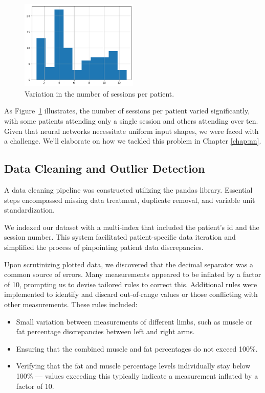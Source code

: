 \begin{figure}[h]
	\centering
	\includegraphics[width=0.5\textwidth]{files/sessions_per_patient}
	\caption{Variation in the number of sessions per patient.}
	\label{fig:sessions-per-patient}
\end{figure}

As Figure~\ref{fig:sessions-per-patient} illustrates, the number of sessions
per patient varied significantly, with some patients attending only a single
session and others attending over ten. Given that neural networks necessitate
uniform input shapes, we were faced with a challenge. We'll elaborate on how we
tackled this problem in Chapter \ref{chap:nn}.
\subsection{Data Cleaning and Outlier Detection}

A data cleaning pipeline was constructed utilizing the \gls{pandas} library.
Essential steps encompassed missing data treatment, duplicate removal, and
variable unit standardization.

We indexed our dataset with a multi-index that included the patient's id and
the session number. This system facilitated patient-specific data iteration and
simplified the process of pinpointing patient data discrepancies.

Upon scrutinizing plotted data, we discovered that the decimal separator was a
common source of errors. Many measurements appeared to be inflated by a factor
of 10, prompting us to devise tailored rules to correct this. Additional rules
were implemented to identify and discard out-of-range values or those
conflicting with other measurements. These rules included:

\begin{itemize}
	\item Small variation between measurements of different limbs, such as muscle or fat
	      percentage discrepancies between left and right arms.
	\item Ensuring that the combined muscle and fat percentages do not exceed 100\%.
	\item Verifying that the fat and muscle percentage levels individually stay below
	      100\% --- values exceeding this typically indicate a measurement inflated by a
	      factor of 10.
\end{itemize}


